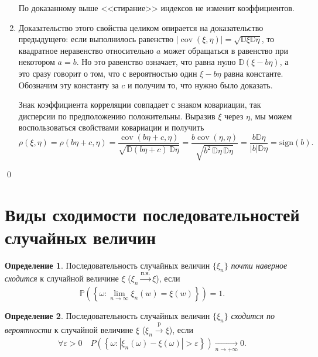 \documentclass[oneside,final,14pt]{extreport}
\renewenvironment{proof}{{\bfseries Доказательство.}}{\qed}
\theoremstyle{plain}
\theoremstyle{definition}
\newtheorem*{defn}{Определение}
\theoremstyle{named}
\begin{document}
\begin{proof}
\begin{enumerate}
    По доказанному выше <<стирание>> индексов не изменит коэффициентов.

    \item Доказательство этого свойства целиком опирается на доказательство предыдущего: если выполнилось равенство $|\operatorname{cov}(\xi, \eta)|=\sqrt{\mathbb{D} \xi \mathbb{D} \eta}$, то квадратное неравенство относительно $a$ может обращаться в равенство при некотором $a = b$. Но это равенство означает, что равна нулю $\mathbb{D}(\xi-b \eta)$, а это сразу говорит о том, что с вероятностью один $\xi - b\eta$ равна константе. Обозначим эту константу за $c$ и получим то, что нужно было доказать.
    
    Знак коэффициента корреляции совпадает с знаком ковариации, так дисперсии по предположению положительны. Выразив $\xi$ через $\eta$, мы можем воспользоваться свойствами ковариации и получить
    $$ \rho(\xi, \eta) = \rho(b\eta + c, \eta)=
    \frac{\operatorname{cov}(b\eta + c, \eta)}
    {\sqrt{\mathbb{D}(b\eta + c) \, \mathbb{D}\eta}} = 
    \frac{b\operatorname{cov}(\eta, \eta)}
    {\sqrt{b^2\, \mathbb{D}\eta \, \mathbb{D}\eta}} = 
    \frac{b\mathbb{D}\eta}
    {|b|\mathbb{D}\eta} = 
    \text{sign}(b).
    $$

\end{enumerate}
\end{proof}

\section{Виды сходимости последовательностей случайных величин}
\begin{defn}
    Последовательность случайных величин $\{\xi_n\}$ {\it почти наверное сходится} к случайной величине $\xi$ ($\xi_n \xrightarrow[]{\text{п.н.}} \xi$), если
    \begin{equation*}
        \mathbb{P}\left(\left\{\omega \colon \lim\limits _{n \rightarrow \infty} \xi_{n}(w)=\xi(w)\right\}\right)=1.
    \end{equation*}
\end{defn}

\begin{defn}
    Последовательность случайных величин $\{\xi_n\}$ {\it сходится по вероятности} к случайной величине $\xi$ ($\xi_n \xrightarrow[]{\text{p}} \xi$), если
    \begin{equation*}
        \forall \varepsilon>0 \quad P\left(\left\{\omega \colon |\xi_{n}(\omega)-\xi(\omega)|>\varepsilon\right\}\right) \xrightarrow[n \to +\infty]{} 0.
    \end{equation*}
\end{defn}
\end{document}
